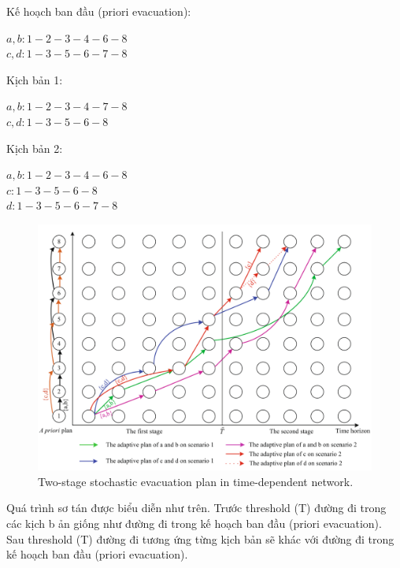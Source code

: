 \documentclass[a4paper]{article}
\begin{document}
{Kế hoạch ban đầu (priori evacuation):}
\begin{center}
 $a, b: 1-2-3-4-6-8$\\
 $c, d: 1-3-5-6-7-8$
\end{center}

{Kịch bản 1:}
 \begin{center}
 $a, b: 1-2-3-4-7-8$\\
 $c, d: 1-3-5-6-8$
 \end{center}

{Kịch bản 2:}
\begin{center}
$a, b: 1-2-3-4-6-8$ \\
$c: 1-3-5-6-8$ \\
$d: 1-3-5-6-7-8$
\end{center}
\begin{figure}[h]
    \centering
    \includegraphics[scale=0.65]{time_dependent_network.png}
    \caption{Two-stage stochastic evacuation plan in time-dependent network.}
    \label{fig:enter-label}
\end{figure}

{Quá trình sơ tán được biểu diễn như trên. Trước threshold (T) đường đi trong các kịch b ản giống như đường đi trong kế hoạch ban đầu (priori evacuation). Sau threshold (T) đường đi tương ứng từng kịch bản sẽ khác với đường đi trong kế hoạch ban đầu (priori evacuation). }
\end{document}
